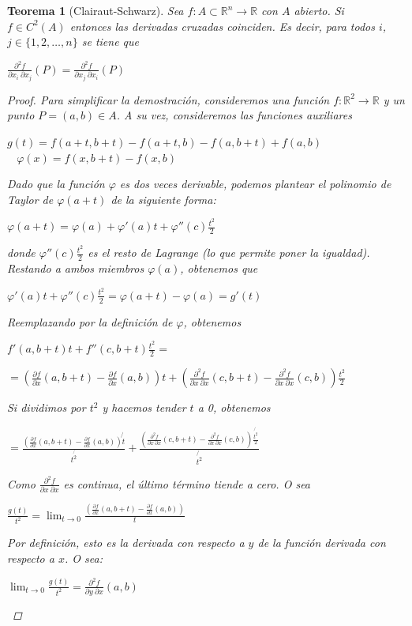 \documentclass[]{article}
\newtheorem{teo}{Teorema}
\def\R{\mathbb{R}}
\newcommand{\dprim}[2]{\frac{\partial #1}{\partial #2}}
\newcommand{\dseg}[3]{\frac{\partial^2 #1}{\partial #2\ \partial #3}}
\begin{document}
\begin{teo}[Clairaut-Schwarz]
	Sea $f:A\subset \R^n\to\R$ con $A$ abierto. Si $f\in C^2(A)$ entonces las derivadas cruzadas coinciden. Es decir, para todos $i$, $j\in \{1,2,\hdots,n\}$ se tiene que
	\begin{center}
		$\displaystyle \dseg{f}{x_i}{x_j}(P) = \dseg{f}{x_j}{x_i}(P)$
	\end{center}
	\begin{proof}
		Para simplificar la demostración, consideremos una función $f:\R^2\to\R$ y un punto $P=(a,b)\in A$. A su vez, consideremos las funciones auxiliares
		\begin{center}
			$g(t) = f(a+t,b+t) - f(a+t,b) - f(a,b+t) + f(a,b)$\\
			~\newline
			$\varphi(x) = f(x,b+t) - f(x,b)$
		\end{center}
		Dado que la función $\varphi$ es dos veces derivable, podemos plantear el polinomio de Taylor de $\varphi(a+t)$ de la siguiente forma:
		\begin{center}
			$\varphi(a+t) = \varphi(a) + \varphi'(a)t + \varphi''(c)\frac{t^2}{2}$
		\end{center}
		donde $\varphi''(c)\frac{t^2}{2}$ es el resto de Lagrange (lo que permite poner la igualdad).
		Restando a ambos miembros $\varphi(a)$, obtenemos que
		\begin{center}
			$\varphi'(a)t + \varphi''(c)\frac{t^2}{2} = \varphi(a+t) - \varphi(a) = g'(t)$
		\end{center}
		Reemplazando por la definición de $\varphi$, obtenemos
		\begin{center}
			$f'(a,b+t)t + f''(c,b+t)\frac{t^2}{2} = $
		\end{center}
		\begin{center}
			$ = \left(\dprim{f}{x}(a,b+t)-\dprim{f}{x}(a,b)\right)t + \left(\dseg{f}{x}{x}(c,b+t) - \dseg{f}{x}{x}(c,b)\right)\frac{t^2}{2}$
		\end{center}
		Si dividimos por $t^2$ y hacemos tender $t$ a 0, obtenemos
		\begin{center}
			$\displaystyle =\frac{\left(\dprim{f}{x}(a,b+t)-\dprim{f}{x}(a,b)\right)\not{t}}{t^{\not{2}}} + \frac{\left(\dseg{f}{x}{x}(c,b+t) - \dseg{f}{x}{x}(c,b)\right)\frac{\not{t^2}}{2}}{\not{t^2}}$
		\end{center}
		Como $\dseg{f}{x}{x}$ es continua, el último término tiende a cero. O sea
		\begin{center}
			$\displaystyle \frac{g(t)}{t^2}= \lim_{t\to 0}\frac{\left(\dprim{f}{x}(a,b+t) - \dprim{f}{x}(a,b)\right)}{t}$
		\end{center}
		Por definición, esto es la derivada con respecto a $y$ de la función derivada con respecto a $x$. O sea:
		\begin{center}
			$\displaystyle \lim_{t\to 0} \frac{g(t)}{t^2} = \dseg{f}{y}{x}(a,b)$
		\end{center}


\end{proof}
\end{teo}
\end{document}
